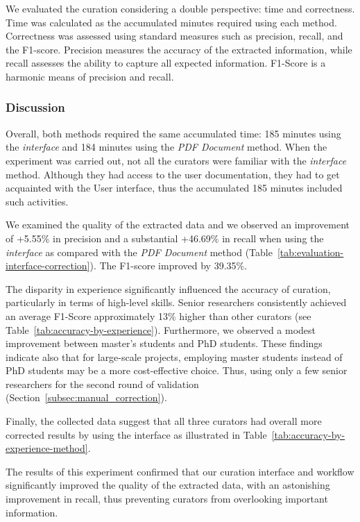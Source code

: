 \documentclass[]{interact}
\theoremstyle{plain} %
\theoremstyle{definition}
\theoremstyle{remark}
\begin{document}
We evaluated the curation considering a double perspective: time and correctness. 
Time was calculated as the accumulated minutes required using each method. 
Correctness was assessed using standard measures such as precision, recall, and the F1-score.
Precision measures the accuracy of the extracted information, while recall assesses the ability to capture all expected information. F1-Score is a harmonic means of precision and recall. 

\subsubsection{Discussion}
Overall, both methods required the same accumulated time: 185 minutes using the \textit{interface} and 184 minutes using the \textit{PDF Document} method.
When the experiment was carried out, not all the curators were familiar with the \textit{interface} method. Although they had access to the user documentation, they had to get acquainted with the User interface, thus the accumulated 185 minutes included such activities. 

We examined the quality of the extracted data and we observed an improvement of +5.55\% in precision and a substantial +46.69\% in recall when using the \textit{interface} as compared with the \textit{PDF Document} method (Table~\ref{tab:evaluation-interface-correction}). 
The F1-score improved by 39.35\%.

The disparity in experience significantly influenced the accuracy of curation, particularly in terms of high-level skills. Senior researchers consistently achieved an average F1-Score approximately 13\% higher than other curators (see Table~\ref{tab:accuracy-by-experience}). Furthermore, we observed a modest improvement between master's students and PhD students. These findings indicate also that for large-scale projects, employing master students instead of PhD students may be a more cost-effective choice. Thus, using only a few senior researchers for the second round of validation (Section~\ref{subsec:manual_correction}).

Finally, the collected data suggest that all three curators had overall more corrected results by using the interface as illustrated in Table~\ref{tab:accuracy-by-experience-method}. 

The results of this experiment confirmed that our curation interface and workflow significantly improved the quality of the extracted data, with an astonishing improvement in recall, thus preventing curators from overlooking important information.
\end{document}
